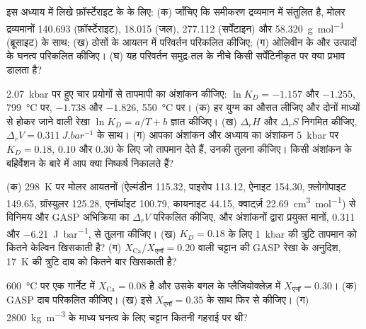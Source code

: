 \begin{exercise}[$\star$]\label{exo:b2:pt-paths:4}
इस अध्याय में लिखे फ़ॉर्स्टेराइट के  के लिए: (क) जाँचिए कि
समीकरण द्रव्यमान में संतुलित है, मोलर द्रव्यमानों 140.693 (फ़ॉर्स्टेराइट), 18.015 (जल),
277.112 (सर्पेंटाइन) और \qty{58.320}{g.mol^{-1}} (ब्रूसाइट) के साथ; (ख) ठोसों के
आयतन में परिवर्तन परिकलित कीजिए; (ग) ओलिवीन के और उत्पादों के घनत्व परिकलित कीजिए।
(घ) यह परिवर्तन समुद्र-तल के नीचे किसी सर्पेंटिनीकृत  पर क्या प्रभाव डालता है?
\end{exercise}

\begin{exercise}[$\star\star$]\label{exo:b2:pt-paths:5}
\qty{2.07}{kbar} पर हुए चार प्रयोगों से तापमापी का अंशांकन कीजिए: $\ln K_D =
-1.157$ और $-1.255$, \qty{799}{\celsius} पर, $-1.738$ और $-1.826$, \qty{550}{\celsius} पर।
(क) हर युग्म का औसत लीजिए और दोनों माध्यों से होकर जाने वाली रेखा $\ln K_D = a/T + b$ ज्ञात कीजिए।
(ख) $\Delta_r H$ और $\Delta_r S$ निगमित कीजिए, $\Delta_r V = \qty{0.311}{J.bar^{-1}}$ के साथ।
(ग) आपका अंशांकन और अध्याय का अंशांकन
\qty{5}{kbar} पर $K_D = 0.18$, $0.10$ और $0.30$ के लिए जो तापमान देते हैं, उनकी तुलना कीजिए। किसी
अंशांकन के बहिर्वेशन के बारे में आप क्या निष्कर्ष निकालते हैं?
\end{exercise}

\begin{exercise}[$\star\star$]\label{exo:b2:pt-paths:6}
(क) \qty{298}{K} पर मोलर आयतनों (ऐल्मंडीन 115.32, पाइरोप 113.12, ऐनाइट
154.30, फ़्लोगोपाइट 149.65, ग्रॉस्युलर 125.28, एनॉर्थाइट 100.79, कायनाइट 44.15, क्वार्ट्ज़
\qty{22.69}{cm^3.mol^{-1}}) से विनिमय और GASP
अभिक्रिया का $\Delta_r V$ परिकलित कीजिए, और अंशांकनों द्वारा प्रयुक्त मानों, \num{0.311} और
\qty{-6.21}{J.bar^{-1}}, से तुलना कीजिए। (ख) $K_D = 0.18$ के लिए
\qty{1}{kbar} की त्रुटि तापमान को कितने केल्विन खिसकाती है? (ग) 
$X_{\text{Ca}}/X_{\text{एनॉ}} = 0.20$ वाली चट्टान की GASP रेखा के अनुदिश, \qty{17}{K} की त्रुटि
दाब को कितने बार खिसकाती है?
\end{exercise}

\begin{exercise}[$\star\star$]\label{exo:b2:pt-paths:7}
\qty{600}{\celsius} पर एक गार्नेट में $X_{\text{Ca}} = 0.08$ है और उसके बगल के प्लैजियोक्लेज़ में
$X_{\text{एनॉ}} = 0.30$। (क) GASP दाब परिकलित कीजिए। (ख) इसे $X_{\text{एनॉ}} =
0.35$ के साथ फिर से कीजिए। (ग) \qty{2800}{kg.m^{-3}} के माध्य घनत्व के लिए चट्टान कितनी गहराई पर थी?
\end{exercise}

